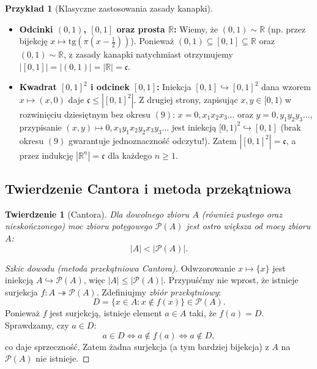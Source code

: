 \documentclass[11pt, a4paper]{article}
\theoremstyle{definition}
\newtheorem{przyklad}[definicja]{Przykład}
\theoremstyle{plain}
\newtheorem{twierdzenie}[definicja]{Twierdzenie}
\theoremstyle{remark}
\begin{document}
\begin{przyklad}[Klasyczne zastosowania zasady kanapki]
\begin{itemize}
    \item \textbf{Odcinki $(0, 1)$, $[0, 1]$ oraz prosta $\mathbb{R}$:} Wiemy, że $(0, 1) \sim \mathbb{R}$ (np. przez bijekcję $x \mapsto \mathrm{tg}(\pi(x - \frac{1}{2}))$). Ponieważ $(0, 1) \subseteq [0, 1] \subseteq \mathbb{R}$ oraz $(0, 1) \sim \mathbb{R}$, z zasady kanapki natychmiast otrzymujemy $|[0, 1]| = |(0, 1)| = |\mathbb{R}| = \mathfrak{c}$.
    \item \textbf{Kwadrat $[0, 1]^2$ i odcinek $[0, 1]$:} Iniekcja $[0, 1] \hookrightarrow [0, 1]^2$ dana wzorem $x \mapsto (x, 0)$ daje $\mathfrak{c} \le |[0, 1]^2|$. Z drugiej strony, zapisując $x, y \in [0, 1)$ w rozwinięciu dziesiętnym bez okresu $(9)$: $x = 0{,}x_1 x_2 x_3 \dots$ oraz $y = 0{,}y_1 y_2 y_3 \dots$, przypisanie $(x, y) \mapsto 0{,}x_1 y_1 x_2 y_2 x_3 y_3 \dots$ jest iniekcją $[0, 1)^2 \hookrightarrow [0, 1]$ (brak okresu $(9)$ gwarantuje jednoznaczność odczytu!). Zatem $|[0, 1]^2| = \mathfrak{c}$, a przez indukcję $|\mathbb{R}^n| = \mathfrak{c}$ dla każdego $n \ge 1$.
\end{itemize}
\end{przyklad}

\subsection{Twierdzenie Cantora i metoda przekątniowa}

\begin{twierdzenie}[Cantora]\label{tw:cantor}
Dla dowolnego zbioru $A$ (również pustego oraz nieskończonego) moc zbioru potęgowego $\mathcal{P}(A)$ jest ostro większa od mocy zbioru $A$:
\[
    |A| < |\mathcal{P}(A)|.
\]
\end{twierdzenie}

\begin{proof}[Szkic dowodu (metoda przekątniowa Cantora)]
Odwzorowanie $x \mapsto \{x\}$ jest iniekcją $A \hookrightarrow \mathcal{P}(A)$, więc $|A| \le |\mathcal{P}(A)|$. Przypuśćmy nie wprost, że istnieje surjekcja $f : A \twoheadrightarrow \mathcal{P}(A)$. Zdefiniujmy \emph{zbiór przekątniowy}:
\[
    D = \{x \in A : x \notin f(x)\} \in \mathcal{P}(A).
\]
Ponieważ $f$ jest surjekcją, istnieje element $a \in A$ taki, że $f(a) = D$. Sprawdzamy, czy $a \in D$:
\[
    a \in D \iff a \notin f(a) \iff a \notin D,
\]
co daje sprzeczność. Zatem żadna surjekcja (a tym bardziej bijekcja) z $A$ na $\mathcal{P}(A)$ nie istnieje.
\end{proof}
\end{document}
